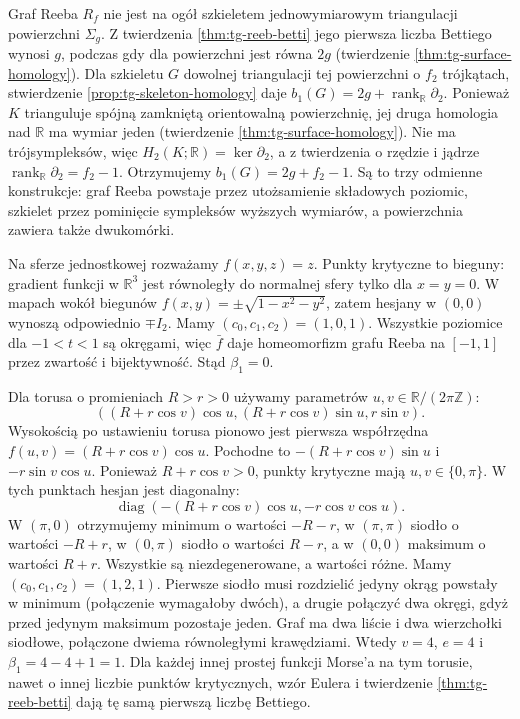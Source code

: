 \begin{uwaga}
Graf Reeba $R_f$ nie jest na ogół szkieletem
jednowymiarowym triangulacji powierzchni $\Sigma_g$.
Z twierdzenia \ref{thm:tg-reeb-betti} jego pierwsza
liczba Bettiego wynosi $g$, podczas gdy dla powierzchni
jest równa $2g$ (twierdzenie \ref{thm:tg-surface-homology}).
Dla szkieletu $G$ dowolnej triangulacji tej powierzchni
o $f_2$ trójkątach, stwierdzenie
\ref{prop:tg-skeleton-homology} daje
$b_1(G)=2g+\operatorname{rank}_{\mathbb R}\partial_2$.
Ponieważ $K$ trianguluje spójną zamkniętą
orientowalną powierzchnię, jej druga homologia
nad $\mathbb R$ ma wymiar jeden (twierdzenie
\ref{thm:tg-surface-homology}). Nie ma trójsympleksów,
więc $H_2(K;\mathbb R)=\ker\partial_2$,
a z twierdzenia o rzędzie i jądrze
$\operatorname{rank}_{\mathbb R}\partial_2=f_2-1$.
Otrzymujemy $b_1(G)=2g+f_2-1$.
Są to trzy odmienne konstrukcje: graf Reeba powstaje
przez utożsamienie składowych poziomic, szkielet przez
pominięcie sympleksów wyższych wymiarów, a powierzchnia
zawiera także dwukomórki.
\end{uwaga}

\begin{przyklad}
Na sferze jednostkowej rozważamy $f(x,y,z)=z$.
Punkty krytyczne to bieguny: gradient funkcji w
$\mathbb R^3$ jest równoległy do normalnej sfery
tylko dla $x=y=0$. W mapach wokół biegunów
$f(x,y)=\pm\sqrt{1-x^2-y^2}$, zatem hesjany w
$(0,0)$ wynoszą odpowiednio $\mp I_2$.
Mamy $(c_0,c_1,c_2)=(1,0,1)$. Wszystkie poziomice
dla $-1<t<1$ są okręgami, więc $\bar f$ daje
homeomorfizm grafu Reeba na $[-1,1]$ przez zwartość
i bijektywność. Stąd $\beta_1=0$.

Dla torusa o promieniach $R>r>0$ używamy parametrów
$u,v\in\mathbb R/(2\pi\mathbb Z)$:
\[
 ((R+r\cos v)\cos u,(R+r\cos v)\sin u,r\sin v).
\]
Wysokością po ustawieniu torusa pionowo jest pierwsza
współrzędna $f(u,v)=(R+r\cos v)\cos u$.
Pochodne to $-(R+r\cos v)\sin u$ i
$-r\sin v\cos u$. Ponieważ $R+r\cos v>0$,
punkty krytyczne mają $u,v\in\{0,\pi\}$.
W tych punktach hesjan jest diagonalny:
\[
 \operatorname{diag}(-(R+r\cos v)\cos u,-r\cos v\cos u).
\]
W $(\pi,0)$ otrzymujemy minimum o wartości $-R-r$,
w $(\pi,\pi)$ siodło o wartości $-R+r$,
w $(0,\pi)$ siodło o wartości $R-r$,
a w $(0,0)$ maksimum o wartości $R+r$.
Wszystkie są niezdegenerowane, a wartości różne.
Mamy $(c_0,c_1,c_2)=(1,2,1)$. Pierwsze siodło musi
rozdzielić jedyny okrąg powstały w minimum (połączenie
wymagałoby dwóch), a drugie połączyć dwa okręgi,
gdyż przed jedynym maksimum pozostaje jeden.
Graf ma dwa liście i dwa wierzchołki siodłowe,
połączone dwiema równoległymi krawędziami.
Wtedy $v=4$, $e=4$ i $\beta_1=4-4+1=1$.
Dla każdej innej prostej funkcji Morse'a na tym
torusie, nawet o innej liczbie punktów krytycznych,
wzór Eulera i twierdzenie \ref{thm:tg-reeb-betti}
dają tę samą pierwszą liczbę Bettiego.
\end{przyklad}

